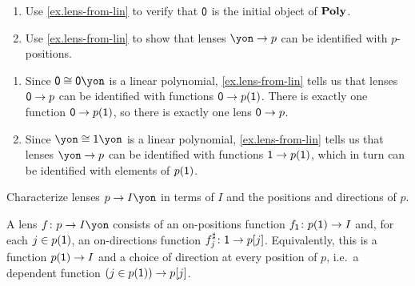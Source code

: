 \documentclass[Book-Poly]{subfiles}
\begin{document}
\begin{exercise} \label{exc.lens-from-0-or-yon}
\begin{enumerate}
  \item Use \cref{ex.lens-from-lin} to verify that $\textsf{0}$ is the initial object of $\mathbf{Poly}$.
  \item Use \cref{ex.lens-from-lin} to show that lenses $\yon\to p$ can be identified with $p$-positions. \qedhere
\end{enumerate}
\begin{solution}
  \begin{enumerate}
    \item Since $\0\iso\0\yon$ is a linear polynomial, \cref{ex.lens-from-lin} tells us that lenses $\textsf{0}\to p$ can be identified with functions $\textsf{0}\to p(\textsf{1})$.
    There is exactly one function $\textsf{0}\to p(\textsf{1})$, so there is exactly one lens $\textsf{0}\to p$.
    \item Since $\yon\iso\1\yon$ is a linear polynomial, \cref{ex.lens-from-lin} tells us that lenses $\yon\to p$ can be identified with functions $\textsf{1}\to p(\textsf{1})$, which in turn can be identified with elements of $p(\textsf{1})$.
  \end{enumerate}
\end{solution}
\end{exercise}

\begin{exercise}
  Characterize lenses $p\to I\yon$ in terms of $I$ and the positions and directions of $p$.
\begin{solution}
  A lens $f\colon p\to I\yon$ consists of an on-positions function $f_{\textsf{1}}\colon p(\textsf{1})\to I$ and, for each $j\in p(\textsf{1})$, an on-directions function $f^\sharp_j\colon\textsf{1}\to p[j]$.
  Equivalently, this is a function $p(\textsf{1})\to I$ and a choice of direction at every position of $p$, i.e.\ a dependent function $(j\in p(\textsf{1}))\to p[j]$.
\end{solution}
\end{exercise}
\end{document}
